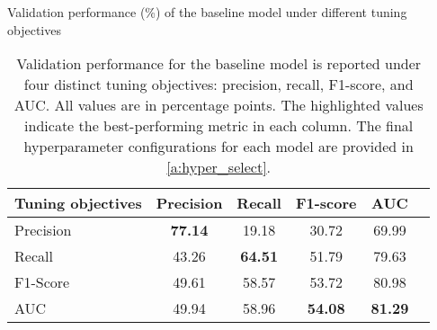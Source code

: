 \begin{table}[!t]
    \centering
    \caption{Validation performance (\%) of the baseline model under different tuning objectives}
    \label{tab:baseline-validation}
    \begin{tabular}{lccccc}
    \toprule
    \textbf{Tuning objectives} & \textbf{Precision} & \textbf{Recall} & \textbf{F1-score} & \textbf{AUC} \\
    \midrule
    Precision  & \textbf{77.14} & 19.18 & 30.72 & 69.99 \\
    Recall     & 43.26 & \textbf{64.51} & 51.79 & 79.63 \\
    F1-Score   & 49.61 & 58.57 & 53.72 & 80.98 \\
    AUC        & 49.94 & 58.96 & \textbf{54.08} & \textbf{81.29} \\
    \bottomrule
    \end{tabular}
    \vspace{2mm}
    \caption*{\footnotesize Validation performance for the baseline model is reported under four distinct tuning objectives: precision, recall, F1-score, and AUC. All values are in percentage points. The highlighted values indicate the best-performing metric in each column. The final hyperparameter configurations for each model are provided in \ref{a:hyper_select}.}
\end{table}